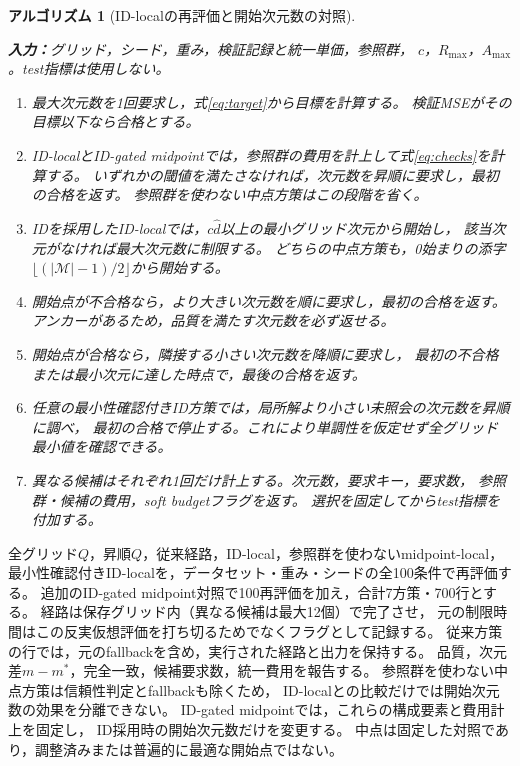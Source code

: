 \documentclass[11pt,a4paper]{ltjsarticle}
\newtheorem{Algorithm}{アルゴリズム}
\begin{document}
\medskip\noindent\begin{minipage}{\linewidth}
\begin{Algorithm}[ID-localの再評価と開始次元数の対照]
\label{alg:replay}\normalfont\small\leavevmode\par\noindent
\textbf{入力：}グリッド，シード，重み，検証記録と統一単価，参照群，
$c$，$R_{\max}$，$A_{\max}$。test指標は使用しない。
\begin{enumerate}
\item 最大次元数を1回要求し，式\ref{eq:target}から目標を計算する。
検証MSEがその目標以下なら合格とする。
\item ID-localとID-gated midpointでは，参照群の費用を計上して式\ref{eq:checks}を計算する。
いずれかの閾値を満たさなければ，次元数を昇順に要求し，最初の合格を返す。
参照群を使わない中点方策はこの段階を省く。
\item IDを採用したID-localでは，$c\hat d$以上の最小グリッド次元から開始し，
該当次元がなければ最大次元数に制限する。
どちらの中点方策も，0始まりの添字$\lfloor(|\mathcal M|-1)/2\rfloor$から開始する。

\item 開始点が不合格なら，より大きい次元数を順に要求し，最初の合格を返す。
アンカーがあるため，品質を満たす次元数を必ず返せる。
\item 開始点が合格なら，隣接する小さい次元数を降順に要求し，
最初の不合格または最小次元に達した時点で，最後の合格を返す。
\item 任意の最小性確認付きID方策では，局所解より小さい未照会の次元数を昇順に調べ，
最初の合格で停止する。これにより単調性を仮定せず全グリッド最小値を確認できる。
\item 異なる候補はそれぞれ1回だけ計上する。次元数，要求キー，要求数，
参照群・候補の費用，soft budgetフラグを返す。
選択を固定してからtest指標を付加する。
\end{enumerate}
\end{Algorithm}
\end{minipage}\medskip

全グリッド$Q$，昇順$Q$，従来経路，ID-local，参照群を使わないmidpoint-local，
最小性確認付きID-localを，データセット・重み・シードの全100条件で再評価する。
追加のID-gated midpoint対照で100再評価を加え，合計7方策・700行とする。
経路は保存グリッド内（異なる候補は最大12個）で完了させ，
元の制限時間はこの反実仮想評価を打ち切るためでなくフラグとして記録する。
従来方策の行では，元のfallbackを含め，実行された経路と出力を保持する。
品質，次元差$m-m^*$，完全一致，候補要求数，統一費用を報告する。
参照群を使わない中点方策は信頼性判定とfallbackも除くため，
ID-localとの比較だけでは開始次元数の効果を分離できない。
ID-gated midpointでは，これらの構成要素と費用計上を固定し，
ID採用時の開始次元数だけを変更する。
中点は固定した対照であり，調整済みまたは普遍的に最適な開始点ではない。
\end{document}
